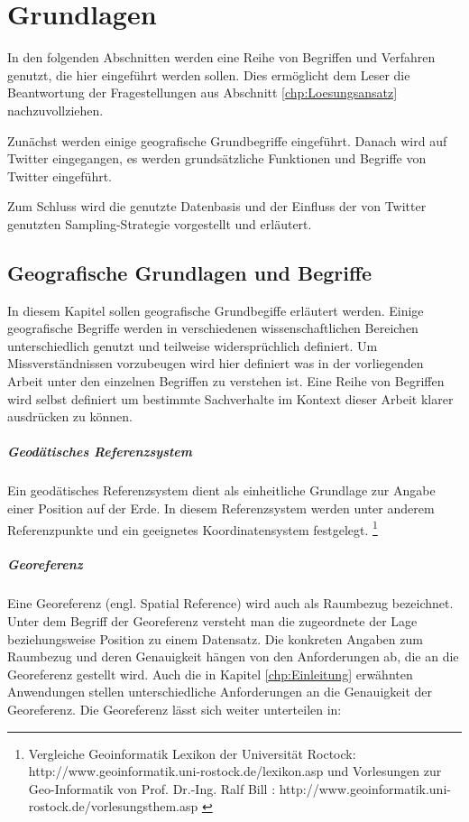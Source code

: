 \chapter{Grundlagen} \label{chp:Grundlagen}  
In den folgenden Abschnitten werden eine Reihe von Begriffen und Verfahren genutzt, die hier eingeführt werden sollen.     
Dies ermöglicht dem Leser die Beantwortung der Fragestellungen aus Abschnitt \ref{chp:Loesungsansatz} nachzuvollziehen.    
 
Zunächst werden einige geografische Grundbegriffe eingeführt. 
Danach wird auf Twitter eingegangen, es werden grundsätzliche Funktionen und Begriffe von Twitter eingeführt. 

 
Zum Schluss wird die genutzte Datenbasis und der Einfluss der von Twitter genutzten Sampling-Strategie vorgestellt und erläutert.

\newpage

	\section{Geografische Grundlagen und Begriffe}
	In diesem Kapitel sollen geografische Grundbegiffe erläutert werden. 
	Einige geografische Begriffe werden in verschiedenen wissenschaftlichen Bereichen unterschiedlich genutzt und teilweise widersprüchlich definiert. 
	Um Missverständnissen vorzubeugen wird hier definiert was in der vorliegenden Arbeit unter den einzelnen Begriffen zu verstehen ist.
	Eine Reihe von Begriffen wird selbst definiert um bestimmte Sachverhalte im Kontext dieser Arbeit klarer ausdrücken zu können. 

		\paragraph*{Geodätisches Referenzsystem} 
		Ein geodätisches Referenzsystem dient als einheitliche Grundlage zur Angabe einer Position auf der Erde. 
		In diesem Referenzsystem werden unter anderem Referenzpunkte und ein geeignetes Koordinatensystem festgelegt. \footnote{Vergleiche Geoinformatik Lexikon der Universität Roctock: http://www.geoinformatik.uni-rostock.de/lexikon.asp und Vorlesungen zur Geo-Informatik von Prof. Dr.-Ing. Ralf Bill : http://www.geoinformatik.uni-rostock.de/vorlesungsthem.asp \label{ft:geoinfolex} }   
		
		\paragraph{Georeferenz}
		Eine Georeferenz (engl. Spatial Reference) wird auch als Raumbezug bezeichnet. 
		Unter dem Begriff der Georeferenz versteht man die zugeordnete der Lage beziehungsweise Position zu einem Datensatz. 
		Die konkreten Angaben zum Raumbezug und deren Genauigkeit hängen von den Anforderungen ab, die an die Georeferenz gestellt wird. 
		Auch die in Kapitel \ref{chp:Einleitung} erwähnten Anwendungen stellen unterschiedliche Anforderungen an die Genauigkeit der Georeferenz.
		Die Georeferenz lässt sich weiter unterteilen in: 
		
